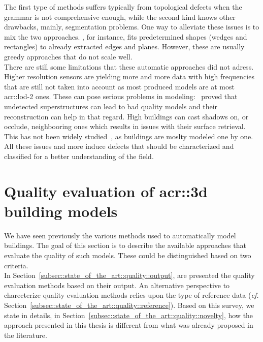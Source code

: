         The first type of methods suffers typically from topological defects when the grammar is not comprehensive enough, while the second kind knows other drawbacks, mainly, segmentation problems.
        One way to alleviate these issues is to mix the two approaches.
        \textcite{werner2002new}, for instance, fits predetermined shapes (wedges and rectangles) to already extracted edges and planes.
        However, these are usually greedy approaches that do not scale well.\\

        There are still some limitations that these automatic approaches did not adress.
        Higher resolution sensors are yielding more and more data with high frequencies that are still not taken into account as most produced models are at most \gls{acr::lod}-2 ones.
        These can pose serious problems in modeling:~\textcite{bredif20073d} proved that undetected superstructures can lead to bad quality models and their reconstruction can help in that regard.
        High buildings can cast shadows on, or occlude, neighbooring ones which results in issues with their surface retrieval.
        This has not been widely studied~\parencite{lafarge2012creating,bao2013generating}, as buildings are moslty modeled one by one.
        All these issues and more induce defects that should be characterized and classified for a better understanding of the field.

\section{Quality evaluation of \texorpdfstring{\gls*{acr::3d}}{3D} building models}
    \label{sec::state_of_the_art::quality}
    We have seen previously the various methods used to automatically model buildings.
    The goal of this section is to describe the available approaches that evaluate the quality of such models.
    These could be distinguished based on two criteria.\\
    In Section~\ref{subsec::state_of_the_art::quality::output}, are presented the quality evaluation methods based on their output.
    An alternative perspective to charecterize quality evaluation methods relies upon the type of reference data (\textit{cf.} Section~\ref{subsec::state_of_the_art::quality::reference}).
    Based on this survey, we state in details, in Section~\ref{subsec::state_of_the_art::quality::novelty}, how the approach presented in this thesis is different from what was already proposed in the literature.

